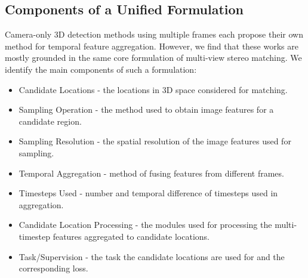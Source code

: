 \documentclass[runningheads, hyperfootnotes=false]{article}
\begin{document}
\subsection{Components of a Unified Formulation}
Camera-only 3D detection methods using multiple frames each propose their own method for temporal feature aggregation. However, we find that these works are mostly grounded in the same core formulation of multi-view stereo matching. We identify the main components of such a formulation:
\begin{itemize}[noitemsep,topsep=0pt]
    \item Candidate Locations - the locations in 3D space considered for matching.
    \item Sampling Operation - the method used to obtain image features for a candidate region.
    \item Sampling Resolution - the spatial resolution of the image features used for sampling.
    \item Temporal Aggregation - method of fusing features from different frames.
    \item Timesteps Used - number and temporal difference of timesteps used in aggregation.
    \item Candidate Location Processing - the modules used for processing the multi-timestep features aggregated to candidate locations.
    \item Task/Supervision - the task the candidate locations are used for and the corresponding loss.
\end{itemize}
\end{document}
